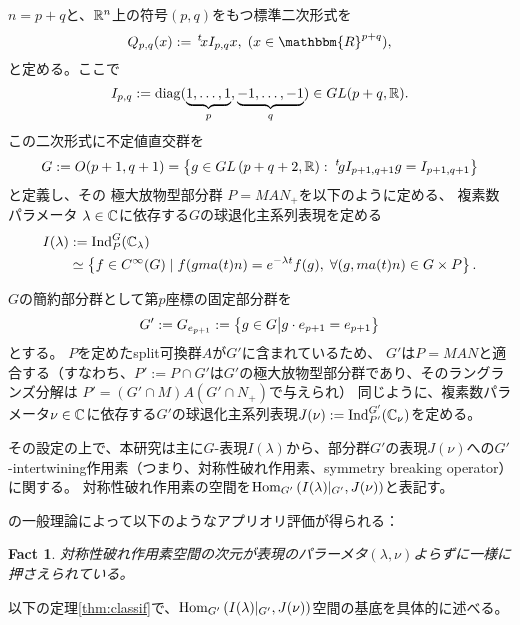 \documentclass[12pt]{article} %
\newcommand{\assign}{:=}
\newcommand{\tmop}[1]{\ensuremath{\operatorname{#1}}}
\newcommand{\Hom}{\mbox{\normalfont Hom}}
\newcommand{\Ind}{\mbox{\normalfont Ind}}
\newtheorem{fact}{Fact}
\theoremstyle{definition}
\theoremstyle{exampstyle} \newtheorem{examp}[theorem]{Theorem}
\renewcommand{\Q}{Q_{p,q}}
\newcommand{\IlambdaGprime}{I(\lambda)\kern-0.3em\mid_{G'}}
\newcommand{\SBO}{\Hom_{G'}\left(\IlambdaGprime,J(\nu) \right)}
\newcommand{\doubt}[1]{\uwave{#1}}
\begin{document}
  \begin{versiona}
	  $n=p+q$と\doubt{し}、$\mathbb{R}^n$上の符号$(p,q)$をもつ標準二次形式を
	  \begin{equation*}
  \Q (x) \assign \,^t \! x I_{p, q} x, \; (x \in
  \mathbbm{R}^{p + q}),
	  \end{equation*}
	  と定める。ここで
\begin{equation*}
   I_{p, q} \assign \tmop{diag} (\underbrace{1, \ldots, 1}_p, \underbrace{-
  1, \ldots, - 1}_q)\in GL(p+q,\R).
\end{equation*}
この二次形式に\doubt{関する}不定値直交群を
\begin{equation*}
	G \assign O (p +
1, q + 1)=\left\{ g\in GL\left( p+q+2,\R \right):\;^t\!gI_{p+1,q+1}g=I_{p+1,q+1} \right\}
\end{equation*}
と定義し、その
極大放物型部分群
$P=MAN_{+}$を以下のように定める、
複素数パラメータ
$\lambda\in\mathbb{C}$に依存する$G$の球退化主系列表現を定める
\begin{align*}
I(\lambda)&:=\Ind_P^G(\C_\lambda)\\
&\simeq \left\{ f\in C^{\infty}(G)\mid f(gma(t)n)=e^{-\lambda t}f(g),\;\forall(g,ma(t)n)\in G\times P \right\}.
\end{align*}

$G$の簡約部分群として第$p$座標の固定部分群を
\begin{equation*}
	G':=G_{e_{p+1}}:=\left\{g \in G\big| g \cdot e_{p + 1} = e_{p + 1}\right\}
\end{equation*}
とする。
$P$を定めたsplit可換群$A$が$G'$に含まれているため、
$G'$は$P=MAN$と適合する（すなわち、$P':=P\cap G'$は$G'$の極大放物型部分群であり、そのラングランズ分解は
$P'=(G'\cap M)A(G'\cap N_+)$で与えられ\doubt{る}）
同じように、複素数パラメータ$\nu\in\mathbb{C}$に依存する$G'$の球退化主系列表現$J(\nu):=\Ind_{P'}^{G'}(\C_{\nu})$を定める。

その設定の上で、本研究は主に$G$-表現$I(\lambda)$から、部分群$G'$の表現$J(\nu)$への$G'$-intertwining作用素（つまり、対称性破れ作用素、symmetry breaking operator）に関する。
対称性破れ作用素の空間を$\SBO$と表記す\doubt{る}。

\cite{kobayashi2013finite,kobayashi2014classification}の一般理論によって以下のようなアプリオリ評価が得られる：
\begin{fact}
	対称性破れ作用素空間の次元が表現のパラーメタ$(\lambda,\nu)$よらずに一様に押さえられている。
\end{fact}
以下の定理\ref{thm:classif}で、$\SBO$空間の基底を具体的に述べる。


\end{versiona}
\end{document}
